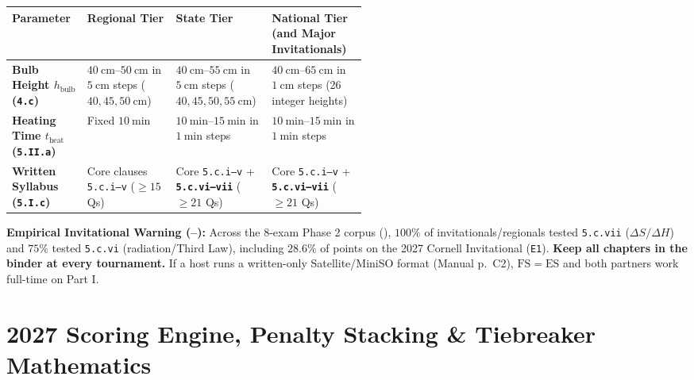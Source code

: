 \par\smallskip

\begin{tierbox}
\par\smallskip\noindent
{\scriptsize\setlength{\tabcolsep}{3pt}\renewcommand{\arraystretch}{1.08}
\begin{tabularx}{\linewidth}{@{}l >{\raggedright\arraybackslash}p{0.25\linewidth} >{\raggedright\arraybackslash}p{0.27\linewidth} >{\raggedright\arraybackslash}X@{}}
\toprule
\textbf{Parameter} & \textbf{Regional Tier} & \textbf{State Tier} & \textbf{National Tier (and Major Invitationals)} \\
\midrule
\textbf{Bulb Height $h_{\mathrm{bulb}}$ (\texttt{4.c})} & $\SIrange{40}{50}{\centi\meter}$ in $\SI{5}{\centi\meter}$ steps ($40, 45, \SI{50}{\centi\meter}$) & $\SIrange{40}{55}{\centi\meter}$ in $\SI{5}{\centi\meter}$ steps ($40, 45, 50, \SI{55}{\centi\meter}$) & $\SIrange{40}{65}{\centi\meter}$ in $\SI{1}{\centi\meter}$ steps (26 integer heights) \\
\textbf{Heating Time $t_{\mathrm{heat}}$ (\texttt{5.II.a})} & Fixed $\SI{10}{\minute}$ & $\SIrange{10}{15}{\minute}$ in $\SI{1}{\minute}$ steps & $\SIrange{10}{15}{\minute}$ in $\SI{1}{\minute}$ steps \\
\textbf{Written Syllabus (\texttt{5.I.c})} & Core clauses \texttt{5.c.i--v} ($\ge 15$ Qs) & Core \texttt{5.c.i--v} + \textbf{\texttt{5.c.vi--vii}} ($\ge 21$ Qs) & Core \texttt{5.c.i--v} + \textbf{\texttt{5.c.vi--vii}} ($\ge 21$ Qs) \\
\bottomrule
\end{tabularx}}
\par\vspace{1.5pt}\noindent
{\scriptsize\textbf{Empirical Invitational Warning (--):} Across the 8-exam Phase 2 corpus (), $100\%$ of invitationals/regionals tested \texttt{5.c.vii} ($\Delta S/\Delta H$) and $75\%$ tested \texttt{5.c.vi} (radiation/Third Law), including $28.6\%$ of points on the 2027 Cornell Invitational (\texttt{E1}). \textbf{Keep all chapters in the binder at every tournament.} If a host runs a written-only Satellite/MiniSO format (Manual p.\ C2), $\mathrm{FS}=\mathrm{ES}$ and both partners work full-time on Part I.}
\end{tierbox}

\clearpage
\section{2027 Scoring Engine, Penalty Stacking \& Tiebreaker Mathematics}\label{sec:00.2}

